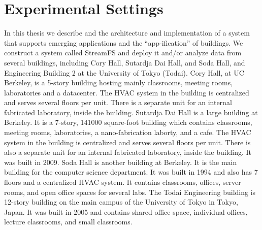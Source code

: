 \section{Experimental Settings}
In this thesis we describe and the architecture and implementation of a system that supports emerging applications and the ``app-ification''
of buildings.  We construct a system called StreamFS and deploy it and/or analyze data from several buildings, including
Cory Hall, Sutardja Dai Hall, and Soda Hall, and Engineering Building 2 at the University of Tokyo (Todai).
Cory Hall, at UC Berkeley, is a 5-story building hosting mainly classrooms, meeting rooms, laboratories and a datacenter.
The HVAC system in the building is centralized and serves several floors per unit.
There is a separate unit for an internal fabricated laboratory, inside the building.
Sutardja Dai Hall is a large building at Berkeley.  It is a 7-story, 141000 square-foot 
 building which contains classrooms, meeting rooms, laboratories, a nano-fabrication laborty, and a cafe.
The HVAC system in the building is centralized and serves several floors per unit.
There is also a separate unit for an internal fabricated laboratory, inside the building.  It was built in 2009.
Soda Hall is another building at Berkeley.  It is the main building for the computer science department.
It was built in 1994 and also has 7 floors and a centralized HVAC system.  It contains classrooms, 
offices, server rooms, and open office spaces for several labs.
The Todai Engineering building is 12-story building on the main campus of the University of Tokyo in Tokyo, Japan.
It was built in 2005 and contains shared office space, individual offices, lecture classrooms, and small
classrooms.

